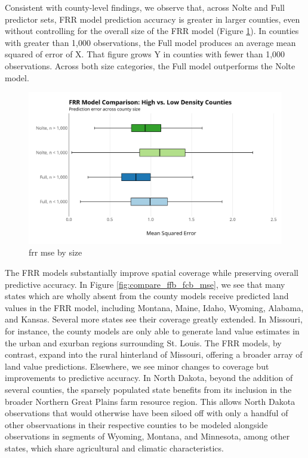 \documentclass[12pt]{article}
\begin{document}
Consistent with county-level findings, we observe that, across Nolte and Full predictor sets, FRR model prediction accuracy is greater in larger counties, even without controlling for the overall size of the FRR model (Figure \ref{fig:frr_compare_mse_size}). In counties with greater than 1,000 observations, the Full model produces an average mean squared of error of X. That figure grows Y in counties with fewer than 1,000 observations. Across both size categories, the Full model outperforms the Nolte model.

\begin{figure}
    \centering
    \includegraphics[width=1\textwidth]{exhibits/frr_compare_mse_size.png}
    \caption{frr mse by size}
    \label{fig:frr_compare_mse_size}
\end{figure}

The FRR models substantially improve spatial coverage while preserving overall predictive accuracy. In Figure \ref{fig:compare_ffb_fcb_mse}, we see that many states which are wholly absent from the county models receive predicted land values in the FRR model, including Montana, Maine, Idaho, Wyoming, Alabama, and Kansas. Several more states see their coverage greatly extended. In Missouri, for instance, the county models are only able to generate land value estimates in the urban and exurban regions surrounding St. Louis. The FRR models, by contrast, expand into the rural hinterland of Missouri, offering a broader array of land value predictions. Elsewhere, we see minor changes to coverage but improvements to predictive accuracy. In North Dakota, beyond the addition of several counties, the sparsely populated state benefits from its inclusion in the broader Northern Great Plains farm resource region. This allows North Dakota observations that would otherwise have been siloed off with only a handful of other observaations in their respective counties to be modeled alongside observations in segments of Wyoming, Montana, and Minnesota, among other states, which share agricultural and climatic characteristics.
\end{document}
